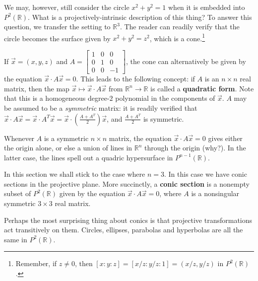 \documentclass[leqno]{book}
\begin{document}
We may, however, still consider the circle $x^2+y^2=1$ when it is embedded into $P^2(\mathbb R)$.  What is a projectively-intrinsic description of this thing?  To answer this question, we transfer the setting to $\mathbb R^3$.  The reader can readily verify that the circle becomes the surface given by $x^2+y^2=z^2$, which is a cone.\footnote{Remember, if $z\ne 0$, then $[x:y:z]=[x/z:y/z:1]=(x/z,y/z)$ in $P^2(\mathbb R)$.}

If $\vec x=(x,y,z)$ and $A=\begin{bmatrix}1&0&0\\0&1&0\\0&0&-1\end{bmatrix}$, the cone can alternatively be given by the equation $\vec x\cdot A\vec x=0$.  This leads to the following concept: if $A$ is an $n\times n$ real matrix, then the map $\vec x\mapsto\vec x\cdot A\vec x$ from $\mathbb R^n\to\mathbb R$ is called a \textbf{quadratic form}.  Note that this is a homogeneous degree-$2$ polynomial in the components of $\vec x$.  $A$ may be assumed to be a \emph{symmetric} matrix: it is readily verified that $\vec x\cdot A\vec x=\vec x\cdot A^T\vec x=\vec x\cdot\left(\frac{A+A^T}2\right)\vec x$, and $\frac{A+A^T}2$ is symmetric.

Whenever $A$ is a symmetric $n\times n$ matrix, the equation $\vec x\cdot A\vec x=0$ gives either the origin alone, or else a union of lines in $\mathbb R^n$ through the origin (why?).  In the latter case, the lines spell out a quadric hypersurface in $P^{n-1}(\mathbb R)$.

In this section we shall stick to the case where $n=3$.  In this case we have conic sections in the projective plane.  More succinctly, a \textbf{conic section} is a nonempty subset of $P^2(\mathbb R)$ given by the equation $\vec x\cdot A\vec x=0$, where $A$ is a nonsingular symmetric $3\times 3$ real matrix.

Perhaps the most surprising thing about conics is that projective transformations act transitively on them.  Circles, ellipses, parabolas and hyperbolas are all the same in $P^2(\mathbb R)$.\\
\end{document}
